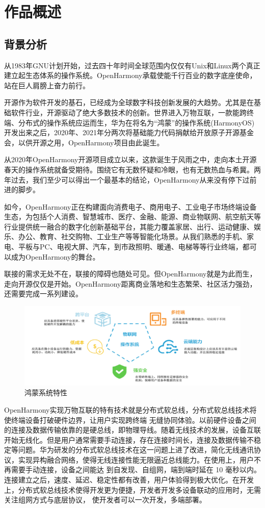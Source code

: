\documentclass[12pt,a4paper]{ctexart}
\begin{document}
\section{作品概述}
\subsection{背景分析}
从1983年GNU计划开始，过去四十年时间全球范围内仅仅有Unix和Linux两个真正建立起生态体系的操作系统。OpenHarmony承载使能千行百业的数字底座使命，站在巨人肩膀上奋力前行。\par
开源作为软件开发的基石，已经成为全球数字科技创新发展的大趋势。尤其是在基础软件行业，开源驱动了绝大多数技术的创新。世界进入万物互联，一款能跨终端、分布式的操作系统应运而生，华为在将名为“鸿蒙”的操作系统(HarmonyOS)开发出来之后，2020年、2021年分两次将基础能力代码捐献给开放原子开源基金会，以供开源之用，OpenHarmony项目由此诞生。\par
从2020年OpenHarmony开源项目成立以来，这款诞生于风雨之中，走向本土开源春天的操作系统就备受期待。围绕它有无数怀疑和冷眼，也有无数热血与希冀。两年过去，我们至少可以得出一个最基本的结论，OpenHarmony从来没有停下过前进的脚步。\par
如今，OpenHarmony正在构建面向消费电子、商用电子、工业电子市场终端设备生态，为包括个人消费、智慧城市、医疗、金融、能源、商业物联网、航空航天等行业提供统一融合的数字化创新基础平台，其能力覆盖家居、出行、运动健康、娱乐、办公、教育、社交购物、工业生产等等智能化场景。从我们熟悉的手机、家电、平板与PC、电视大屏、汽车，到市政照明、暖通、电梯等等行业终端，都可以成为OpenHarmony的舞台。\par
联接的需求无处不在，联接的障碍也随处可见。但OpenHarmony就是为此而生，走向开源仅仅是开始。OpenHarmony距离商业落地和生态繁荣、社区活力强劲，还需要完成一系列建设。
\begin{figure}[H]
\centering
\includegraphics[width=0.8\columnwidth]{./pic/11.png}
\caption{\small{鸿蒙系统特性}}
\end{figure}
OpenHarmony实现万物互联的特有技术就是分布式软总线，分布式软总线技术将使终端设备打破硬件边界，让用户实现跨终端 无缝协同体验。以前硬件设备之间的连接及数据传输依靠的是硬总线，即物理导线。随着无线技术的发展，设备互联开始无线化。但是用户通常需要手动连接，存在连接时间长，连接及数据传输不稳定等问题。华为研发的分布式软总线技术在这一问题上进了改进，简化无线通讯协议，实现异构融合网络，使得无线连接性能无限逼近总线能力。在使用上，用户不再需要手动连接，设备之间能达 到自发现、自组网，端到端时延在 10 毫秒以内。连接建立之后，速度、延迟、稳定性都有改善，用户体验得到极大优化。在开发上，分布式软总线技术使得开发更为便捷，开发者开发多设备联动的应用时，无需关注组网方式与底层协议， 使开发者可以一次开发，多端部署。
\end{document}
